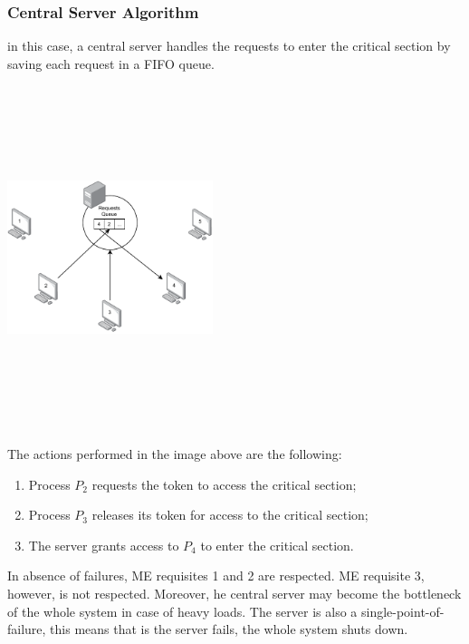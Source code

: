 \documentclass{article}
\begin{document}
\subsubsection{Central Server Algorithm}
in this case, a central server handles the requests to enter the critical section by saving each request in a FIFO queue.
\begin{center}
	\includegraphics[width=6cm, height=10cm, keepaspectratio]{assets/central-server.pdf}
\end{center}
The actions performed in the image above are the following:
\begin{enumerate}
	\item Process $P_2$ requests the token to access the critical section;
	\item Process $P_3$ releases its token for access to the critical section;
	\item The server grants access to $P_4$ to enter the critical section.
\end{enumerate}
In absence of failures, ME requisites 1 and 2 are respected. ME requisite 3, however, is not respected. Moreover, he central server may become the bottleneck of the whole system in case of heavy loads. The server is also a single-point-of-failure, this means that is the server fails, the whole system shuts down.
\end{document}
